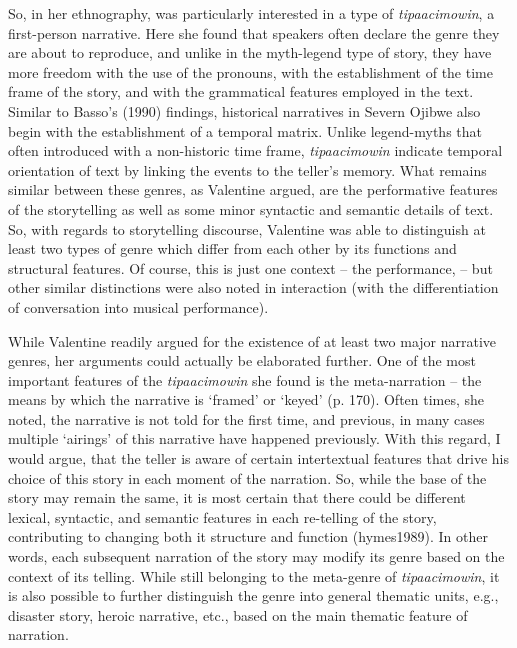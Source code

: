 \documentclass[12pt, draft]{article}
\begin{document}
So, in her ethnography, \textcite{valentine1995} was particularly interested in a type of \textit{tipaacimowin}, a first-person narrative. Here she found that  speakers often declare the genre they are about to reproduce, and unlike in the myth-legend type of story, they have more freedom with the use of the pronouns, with the establishment of the time frame of the story, and with the grammatical features employed in the text. Similar to Basso's (1990) findings, historical narratives in Severn Ojibwe also begin with the establishment of a temporal matrix. Unlike legend-myths that often introduced with a non-historic time frame, \textit{tipaacimowin} indicate temporal orientation of text by linking the events to the teller's memory. What remains similar between these genres, as Valentine argued, are the performative features of the storytelling as well as some minor syntactic and semantic details of text. So, with regards to storytelling discourse, Valentine was able to distinguish at least two types of genre which differ from each other by its functions and structural features. Of course, this is just one context -- the performance, -- but other similar distinctions were also noted in interaction (with the differentiation of conversation into musical performance).

While Valentine readily argued for the existence of at least two major narrative genres, her arguments could actually be elaborated further. One of the most important features of the \textit{tipaacimowin} she found is the meta-narration -- the means by which the narrative is `framed' or `keyed' (p. 170). Often times, she noted, the narrative is not told for the first time, and previous, in many cases multiple `airings' of this narrative have happened previously. With this regard, I would argue, that the teller is aware of certain intertextual features that drive his choice of this story in each moment of the narration. So, while the base of the story may remain the same, it is most certain that there could be different  lexical, syntactic, and semantic features in each re-telling of the story, contributing to changing both it structure and function (hymes1989). In other words, each subsequent narration of the story may modify its genre based on the context of its telling. While still belonging to the meta-genre of \textit{tipaacimowin}, it is also  possible to further distinguish the genre into general thematic units, e.g., disaster story, heroic narrative, etc., based on the main thematic feature of narration.
\end{document}
